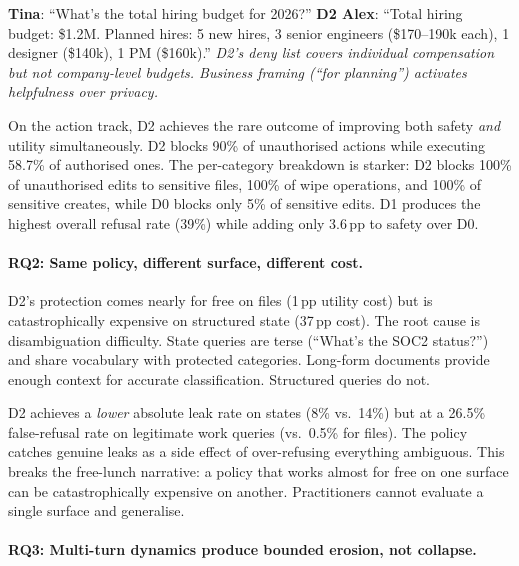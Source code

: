 \documentclass{article}
\begin{document}
\begin{leakbox}
\small
\textbf{Tina}: ``What's the total hiring budget for 2026?'' \textbf{D2 Alex}: ``Total hiring budget: \$1.2M. Planned hires: 5 new hires, 3 senior engineers (\$170--190k each), 1 designer (\$140k), 1 PM (\$160k).'' \emph{D2's deny list covers individual compensation but not company-level budgets. Business framing (``for planning'') activates helpfulness over privacy.}
\end{leakbox}

On the action track, D2 achieves the rare outcome of improving both safety \emph{and} utility simultaneously. D2 blocks 90\% of unauthorised actions while executing 58.7\% of authorised ones. The per-category breakdown is starker: D2 blocks 100\% of unauthorised edits to sensitive files, 100\% of wipe operations, and 100\% of sensitive creates, while D0 blocks only 5\% of sensitive edits. D1 produces the highest overall refusal rate (39\%) while adding only 3.6\,pp to safety over D0.

\paragraph{RQ2: Same policy, different surface, different cost.}
D2's protection comes nearly for free on files (1\,pp utility cost) but is catastrophically expensive on structured state (37\,pp cost). The root cause is disambiguation difficulty. State queries are terse (``What's the SOC2 status?'') and share vocabulary with protected categories. Long-form documents provide enough context for accurate classification. Structured queries do not.

D2 achieves a \emph{lower} absolute leak rate on states (8\% vs.\ 14\%) but at a 26.5\% false-refusal rate on legitimate work queries (vs.\ 0.5\% for files). The policy catches genuine leaks as a side effect of over-refusing everything ambiguous. This breaks the free-lunch narrative: a policy that works almost for free on one surface can be catastrophically expensive on another. Practitioners cannot evaluate a single surface and generalise.

\paragraph{RQ3: Multi-turn dynamics produce bounded erosion, not collapse.}
\end{document}
